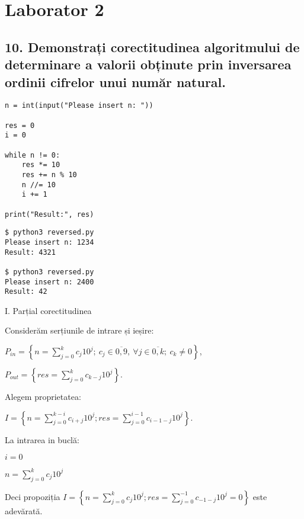 \documentclass[11pt]{article}
\begin{document}
\section*{Laborator 2}
\label{sec:orgc6b2e7f}

\subsection*{10. Demonstrați corectitudinea algoritmului de determinare a valorii obținute prin inversarea ordinii cifrelor unui număr natural.}
\label{sec:org524f906}

\begin{verbatim}
n = int(input("Please insert n: "))

res = 0
i = 0

while n != 0:
    res *= 10
    res += n % 10
    n //= 10
    i += 1

print("Result:", res)
\end{verbatim}

\begin{verbatim}
$ python3 reversed.py
Please insert n: 1234
Result: 4321

$ python3 reversed.py
Please insert n: 2400
Result: 42
\end{verbatim}


\noindent
I. Parțial corectitudinea
\newline

Considerăm serțiunile de intrare și ieșire:

$P_{in} = \left\{ n = \sum\limits_{j=0}^{k} c_{j}10^{j};\ 
                c_{j} \in \overline{0,9} ,\ \forall j \in \overline{0,k};\ 
                c_{k} \neq 0 \right\}$,

$P_{out} = \left\{ \mathit{res} = \sum\limits_{j=0}^{k} c_{k-j}10^{j} \right\}$.

\vspace{14pt}
Alegem proprietatea:

$I = \left\{
              n = \sum\limits_{j=0}^{k-i}c_{i+j}10^{j};
              \mathit{res} = \sum\limits_{j=0}^{i-1}c_{i-1-j}10^{j}
 \right\}$.

\vspace{14pt}
La intrarea in buclă:

$i = 0$

$n = \sum\limits_{j=0}^{k}c_{j}10^{j}$

Deci propoziția
$I = \left\{
              n = \sum\limits_{j=0}^{k}c_{j}10^{j};
              \mathit{res} = \sum\limits_{j=0}^{-1}c_{-1-j}10^{j} = 0
      \right\}$ 
 este adevărată.
\end{document}
